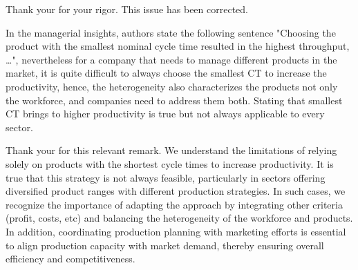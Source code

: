 \documentclass[preprint,11pt,3p]{elsarticle}
\begin{document}
\begin{tcolorbox}[colback=r_color1,colframe=r_color2,title=R17:]
Thank your for your rigor. This issue has been corrected.
\end{tcolorbox}
\begin{tcolorbox}[colback=q_color1,colframe=q_color2,title=Q18  :] In the managerial insights, authors state the following sentence "Choosing the product with the smallest nominal cycle time resulted in the highest throughput, …", nevertheless for a company that needs to manage different products in the market, it is quite difficult to always choose the smallest CT to increase the productivity, hence, the heterogeneity also characterizes the products not only the workforce, and companies need to address them both. Stating that smallest CT brings to higher productivity is true but not always applicable to every sector.
\end{tcolorbox}

\begin{tcolorbox}[colback=r_color1,colframe=r_color2,title=R18:]
Thank your for this relevant remark. 
We understand the limitations of relying solely on products with the shortest cycle times to increase productivity. It is true that this strategy is not always feasible, particularly in sectors offering diversified product ranges with different production strategies. In such cases, we recognize the importance of adapting the approach by integrating other criteria (profit, costs, etc) and balancing the heterogeneity of the workforce and products. In addition, coordinating production planning with marketing efforts is essential to align production capacity with market demand, thereby ensuring overall efficiency and competitiveness.

\end{tcolorbox}










\newpage
{}
 
% 

% 
\end{document}
